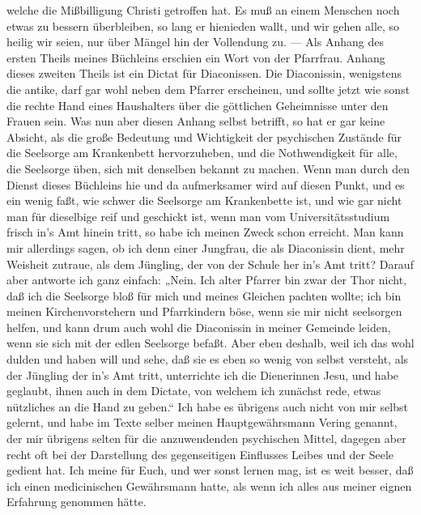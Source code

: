welche die Mißbilligung Christi getroffen hat. Es muß an einem Menschen noch etwas zu bessern überbleiben, so lang er hienieden wallt, und wir gehen alle, so heilig wir seien, nur über Mängel hin der Vollendung zu. — Als Anhang des ersten Theils meines Büchleins erschien ein Wort von der Pfarrfrau. Anhang dieses zweiten Theils ist ein Dictat für Diaconissen. Die Diaconissin, wenigstens die antike, darf gar wohl neben dem Pfarrer erscheinen, und sollte jetzt wie sonst die rechte Hand eines Haushalters über die göttlichen Geheimnisse unter den Frauen sein. Was nun aber diesen Anhang selbst betrifft, so hat er gar keine Absicht, als die große Bedeutung und Wichtigkeit der psychischen Zustände für die Seelsorge am Krankenbett hervorzuheben, und die Nothwendigkeit für alle, die Seelsorge üben, sich mit denselben bekannt zu machen. Wenn man durch den Dienst dieses Büchleins hie und da aufmerksamer wird auf diesen Punkt, und es ein wenig faßt, wie schwer die Seelsorge am Krankenbette ist, und wie gar nicht man für dieselbige reif und geschickt ist, wenn man vom Universitätsstudium frisch in’s Amt hinein tritt, so habe ich meinen Zweck schon erreicht. Man kann mir allerdings sagen, ob ich denn einer Jungfrau, die als Diaconissin dient, mehr Weisheit zutraue, als dem Jüngling, der von der Schule her in’s Amt tritt? Darauf aber antworte ich ganz einfach: „Nein. Ich alter Pfarrer bin zwar der Thor nicht, daß ich die Seelsorge bloß für mich und meines Gleichen pachten wollte; ich bin meinen Kirchenvorstehern und Pfarrkindern böse, wenn sie mir nicht seelsorgen helfen, und kann drum auch wohl die Diaconissin in meiner Gemeinde leiden, wenn sie sich mit der edlen Seelsorge befaßt. Aber eben deshalb, weil ich das wohl dulden und haben will und sehe, daß sie es eben so wenig von selbst versteht, als der Jüngling der in’s Amt tritt, unterrichte ich die Dienerinnen Jesu, und habe geglaubt, ihnen auch in dem Dictate,
von welchem ich zunächst rede, etwas nützliches an die Hand zu geben.“ Ich habe es übrigens auch nicht von mir selbst gelernt, und habe im Texte selber meinen Hauptgewährsmann Vering genannt, der mir übrigens selten für die anzuwendenden psychischen Mittel, dagegen aber recht oft bei der Darstellung des gegenseitigen Einflusses Leibes und der Seele gedient hat. Ich meine für Euch, und wer sonst lernen mag, ist es weit besser, daß ich einen medicinischen Gewährsmann hatte, als wenn ich alles aus meiner eignen Erfahrung genommen hätte.

